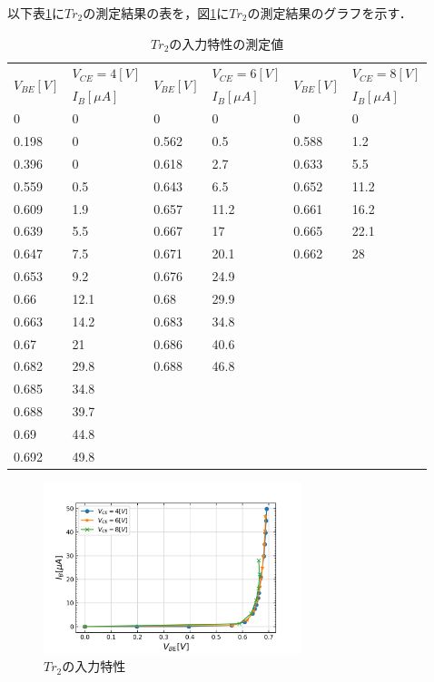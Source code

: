 \documentclass[10pt, a4j, dvipdfmx]{jarticle}
\begin{document}
    \newpage
    以下表\ref{tbl:2}に$Tr_2$の測定結果の表を，図\ref{ex:2}に$Tr_2$の測定結果のグラフを示す．
    \begin{table}[H]
        \centering
        \caption{$Tr_2$の入力特性の測定値}
        \label{tbl:2}
        \small
        \begin{tabular}{|l|l||l|l||l|l|}
            \hline
            \multirow{2}{*}{$V_{BE}[V]$} & $V_{CE}=4[V]$ & \multirow{2}{*}{$V_{BE}[V]$} & $V_{CE}=6[V]$ & \multirow{2}{*}{$V_{BE}[V]$} & $V_{CE}=8[V]$ \\ \cline{2-2} \cline{4-4} \cline{6-6} 
            & $I_B[\mu A]$   &                         & $I_B[\mu A]$   &                         & $I_B[\mu A]$   \\ \hline
            0     & 0    & 0     & 0    & 0     & 0    \\ \hline
            0.198 & 0    & 0.562 & 0.5  & 0.588 & 1.2  \\ \hline
            0.396 & 0    & 0.618 & 2.7  & 0.633 & 5.5  \\ \hline
            0.559 & 0.5  & 0.643 & 6.5  & 0.652 & 11.2 \\ \hline
            0.609 & 1.9  & 0.657 & 11.2 & 0.661 & 16.2 \\ \hline
            0.639 & 5.5  & 0.667 & 17   & 0.665 & 22.1 \\ \hline
            0.647 & 7.5  & 0.671 & 20.1 & 0.662 & 28   \\ \hline
            0.653 & 9.2  & 0.676 & 24.9 &       &      \\ \hline
            0.66  & 12.1 & 0.68  & 29.9 &       &      \\ \hline
            0.663 & 14.2 & 0.683 & 34.8 &       &      \\ \hline
            0.67  & 21   & 0.686 & 40.6 &       &      \\ \hline
            0.682 & 29.8 & 0.688 & 46.8 &       &      \\ \hline
            0.685 & 34.8 &       &      &       &      \\ \hline
            0.688 & 39.7 &       &      &       &      \\ \hline
            0.69  & 44.8 &       &      &       &      \\ \hline
            0.692 & 49.8 &       &      &       &      \\ \hline
        \end{tabular}
        \normalsize
    \end{table}
    \begin{figure}[H]
        \centering
        \includegraphics[height=50mm]{ex-2.png}
        \caption{$Tr_2$の入力特性}
        \label{ex:2}    
    \end{figure}
\end{document}
